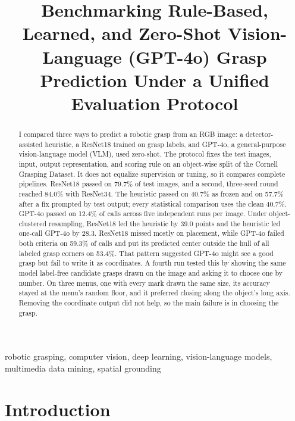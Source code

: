 \documentclass[10pt,conference,compsoc]{IEEEtran}
\title{Benchmarking Rule-Based, Learned, and Zero-Shot Vision-Language (GPT-4o) Grasp Prediction Under a Unified Evaluation Protocol}
\author{\IEEEauthorblockN{Anish Talla}
\IEEEauthorblockA{\textit{High School Student}\\
Lightridge High School and Academies of Loudoun\\
Virginia, United States\\
anish.talla99@gmail.com}}
\begin{document}
\maketitle

\begin{abstract}
I compared three ways to predict a robotic grasp from an RGB image: a
detector-assisted heuristic, a ResNet18 trained on grasp labels, and GPT-4o,
a general-purpose vision-language model (VLM), used zero-shot. The protocol
fixes the test images, input, output representation, and scoring rule on an
object-wise split of the Cornell Grasping Dataset. It does not equalize
supervision or tuning, so it compares complete pipelines. ResNet18 passed on
79.7\% of test images, and a second, three-seed round reached 84.0\% with
ResNet34. The
heuristic passed on 40.7\% as frozen and on 57.7\% after a fix prompted by
test output; every statistical comparison uses the clean 40.7\%. GPT-4o
passed on 12.4\% of calls across five independent runs per image. Under
object-clustered resampling, ResNet18 led the heuristic by 39.0 points and
the heuristic led one-call GPT-4o by 28.3. ResNet18 missed mostly on
placement, while GPT-4o failed both criteria on 59.3\% of
calls and put its predicted center outside the hull of all labeled grasp
corners on 53.4\%. That pattern suggested GPT-4o might see a good grasp but
fail to write it as coordinates. A fourth run tested this by showing the same
model label-free candidate grasps drawn on the image and asking it to choose
one by number. On three menus, one with every mark drawn the same size, its
accuracy stayed at the menu's random floor, and it preferred closing along
the object's long axis. Removing the coordinate output did not help, so the
main failure is in choosing the grasp.
\end{abstract}

\begin{IEEEkeywords}
robotic grasping, computer vision, deep learning, vision-language models,
multimedia data mining, spatial grounding
\end{IEEEkeywords}

\section{Introduction}
\end{document}
